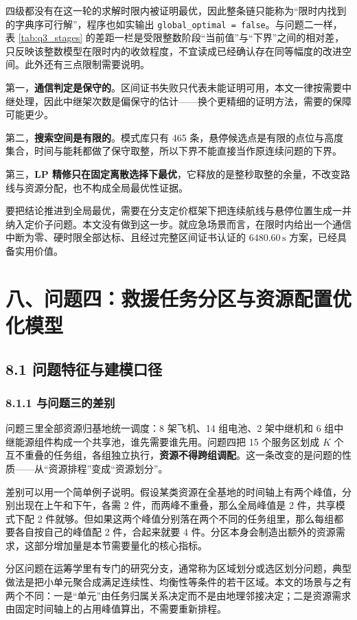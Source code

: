 \documentclass[withoutpreface,bwprint]{format}
\begin{document}
四级都没有在这一轮的求解时限内被证明最优，因此整条链只能称为“限时内找到的字典序可行解”，程序也如实输出 \texttt{global\_optimal = false}。与问题二一样，表 \ref{tab:q3_stages} 的差距一栏是受限整数阶段“当前值”与“下界”之间的相对差，只反映该整数模型在限时内的收敛程度，不宜读成已经确认存在同等幅度的改进空间。此外还有三点限制需要说明。

第一，\textbf{通信判定是保守的}。区间证书失败只代表未能证明可用，本文一律按需要中继处理，因此中继架次数是偏保守的估计——换个更精细的证明方法，需要的保障可能更少。

第二，\textbf{搜索空间是有限的}。模式库只有 465 条，悬停候选点是有限的点位与高度集合，时间与能耗都做了保守取整，所以下界不能直接当作原连续问题的下界。

第三，\textbf{LP 精修只在固定离散选择下最优}，它释放的是整秒取整的余量，不改变路线与资源分配，也不构成全局最优性证据。

要把结论推进到全局最优，需要在分支定价框架下把连续航线与悬停位置生成一并纳入定价子问题\cite{barnhart1998}。本文没有做到这一步。就应急场景而言，在限时内给出一个通信中断为零、硬时限全部达标、且经过完整区间证书认证的 $6480.60\,\text{s}$ 方案，已经具备实用价值。

\clearpage
\section{八、问题四：救援任务分区与资源配置优化模型}

\subsection{8.1 问题特征与建模口径}

\subsubsection{8.1.1 与问题三的差别}
问题三里全部资源归基地统一调度：8 架飞机、14 组电池、2 架中继机和 6 组中继能源组件构成一个共享池，谁先需要谁先用。问题四把 15 个服务区划成 $K$ 个互不重叠的任务组，各组独立执行，\textbf{资源不得跨组调配}。这一条改变的是问题的性质——从“资源排程”变成“资源划分”。

差别可以用一个简单例子说明。假设某类资源在全基地的时间轴上有两个峰值，分别出现在上午和下午，各需 2 件，而两峰不重叠，那么全局峰值是 2 件，共享模式下配 2 件就够。但如果这两个峰值分别落在两个不同的任务组里，那么每组都要各自按自己的峰值配 2 件，合起来就要 4 件。分区本身会制造出额外的资源需求，这部分增加量是本节需要量化的核心指标。

分区问题在运筹学里有专门的研究分支，通常称为区域划分或选区划分问题\cite{kalcsics2005}，典型做法是把小单元聚合成满足连续性、均衡性等条件的若干区域\cite{bozkaya2003}。本文的场景与之有两个不同：一是“单元”由任务归属关系决定而不是由地理邻接决定；二是资源需求由固定时间轴上的占用峰值算出，不需要重新排程。
\end{document}
